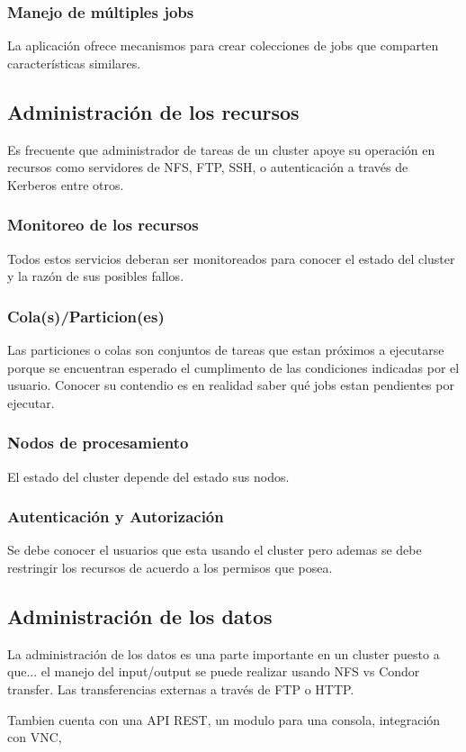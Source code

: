 \subsubsection{Manejo de múltiples jobs}
La aplicación ofrece mecanismos para crear colecciones de jobs que comparten características similares.

\subsection{Administración de los recursos}
Es frecuente que administrador de tareas de un cluster apoye su operación en recursos como servidores de NFS, FTP, SSH, o autenticación a través de Kerberos entre otros.

\subsubsection{Monitoreo de los recursos}
Todos estos servicios deberan ser monitoreados para conocer el estado del cluster y la razón de sus posibles fallos.

\subsubsection{Cola(s)/Particion(es)}
Las particiones o colas son conjuntos de tareas que estan próximos a ejecutarse porque se encuentran esperado el cumplimento de las condiciones indicadas por el usuario. Conocer su contendio es en realidad saber qué jobs estan pendientes por ejecutar.

\subsubsection{Nodos de procesamiento}
El estado del cluster depende del estado sus nodos.

\subsubsection{Autenticación y Autorización}
Se debe conocer el usuarios que esta usando el cluster pero ademas se debe restringir los recursos de acuerdo a los permisos que posea.

\subsection{Administración de los datos}
La administración de los datos es una parte importante en un cluster puesto a que... el manejo del input/output se puede realizar usando NFS vs Condor transfer. Las transferencias externas a través de FTP o HTTP.

Tambien cuenta con una API REST, un modulo para una consola, integración con VNC,
